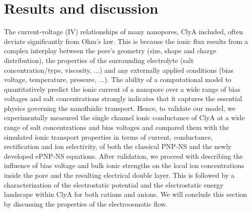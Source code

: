 \documentclass[journal=ancac3,manuscript=article,etalmode=truncate,maxauthors=0,layout=onecolumn]{achemso}
\begin{document}
\section{Results and discussion}\label{sec:results}

The current-voltage (IV) relationships of many nanopores, ClyA included, often deviate significantly from
Ohm's law. This is because the ionic flux results from a complex interplay between the pore's geometry (size,
shape and charge distribution), the properties of the surrounding electrolyte (salt concentration/type,
viscosity, ...) and any externally applied conditions (bias voltage, temperature, pressure, ...). The ability
of a computational model to quantitatively predict the ionic current of a nanopore over a wide range of bias
voltages and salt concentrations strongly indicates that it captures the essential physics governing the
nanofluidic transport. Hence, to validate our model, we experimentally measured the single channel ionic
conductance of ClyA at a wide range of salt concentrations and bias voltages and compared them with the
simulated ionic transport properties in terms of current, conductance, rectification and ion selectivity, of
both the classical PNP-NS and the newly developed ePNP-NS equations. After validation, we proceed with
describing the influence of bias voltage and bulk ionic strengths on the local ion concentrations inside the
pore and the resulting electrical double layer. This is followed by a characterization of the electrostatic
potential and the electrostatic energy landscape within ClyA for both cations and anions. We will conclude
this section by discussing the properties of the electroosmotic flow.
\end{document}
